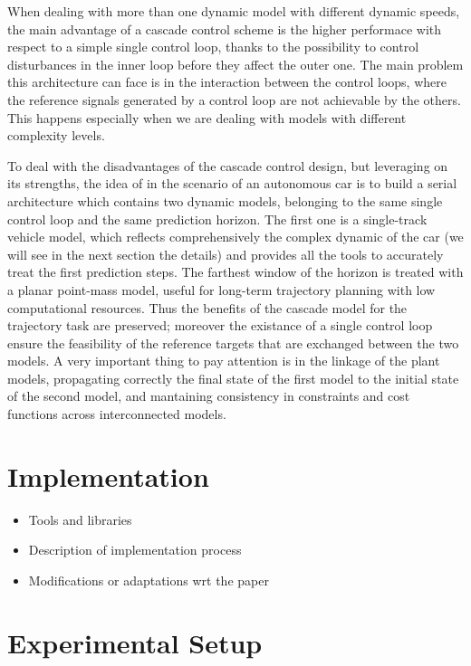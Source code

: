 \documentclass[a4paper, twocolumn, 11pt, twoside]{article}
\begin{document}
When dealing with more than one dynamic model with different dynamic speeds,
the main advantage of a cascade control scheme is the higher performace with respect
to a simple single control loop, thanks to the possibility to control disturbances
in the inner loop before they affect the outer one. The main problem this architecture
can face is in the interaction between the control loops, where the reference signals 
generated by a control loop are not achievable by the others. This happens especially
when we are dealing with models with different complexity levels.

To deal with the disadvantages of the cascade control design, but leveraging on its 
strengths, the idea of \cite{paper} in the scenario of an autonomous car is to build 
a serial architecture which contains two dynamic models, belonging to the same single
control loop and the same prediction horizon. The first one is a single-track vehicle
model, which reflects comprehensively the complex dynamic of the car (we will see in the 
next section the details) and provides all the tools to accurately treat the first
prediction steps. The farthest window of the horizon is treated with a planar point-mass 
model, useful for long-term trajectory planning with low computational resources.
Thus the benefits of the cascade model for the trajectory task are preserved; moreover
the existance of a single control loop ensure the feasibility of the reference targets
that are exchanged between the two models. A very important thing to pay attention is 
in the linkage of the plant models, propagating correctly the final state of the first
model to the initial state of the second model, and mantaining consistency in constraints
and cost functions across interconnected models.




\section*{Implementation}

\begin{itemize}
    \item Tools and libraries
    \item Description of implementation process
    \item Modifications or adaptations wrt the paper
\end{itemize}

\section*{Experimental Setup}
\end{document}
